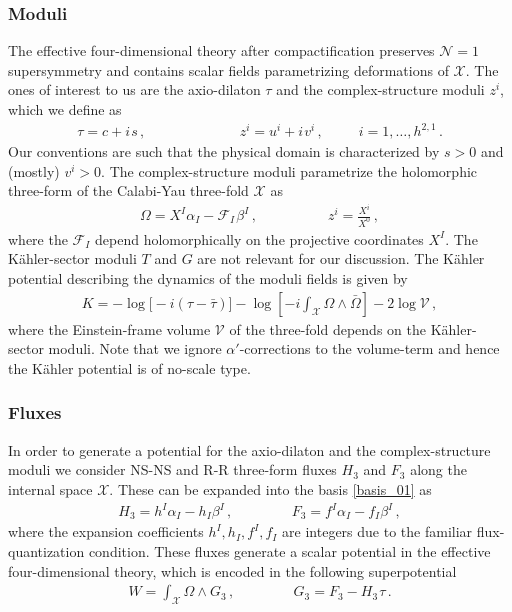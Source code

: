 \documentclass[12pt,a4paper]{article}
\newcommand{\eq}[1]{\begin{equation}
                     \begin{split} #1 \end{split}
                     \end{equation}}
\newcommand{\op}{\hspace{1pt}}
\numberwithin{equation}{section}
\begin{document}
\subsubsection*{Moduli}

The effective four-dimensional theory after compactification 
preserves $\mathcal N=1$ supersymmetry and 
contains  scalar fields parametrizing
deformations of $\mathcal X$.  The ones of interest to us are the axio-dilaton 
$\tau$ and the complex-structure moduli $z^i$, which we define as
\eq{
  \tau = c + i\op s\,, \hspace{80pt} z^i = u^i + i \op v^i \,, \hspace{30pt} i = 1,\ldots, h^{2,1} \,.
}
Our conventions are such that the physical domain is characterized by $s>0$ and (mostly) $v^i>0$. 
The complex-structure moduli parametrize the holomorphic three-form of the Calabi-Yau three-fold 
$\mathcal X$ as
\eq{
  \label{htf_001}
  \Omega = X^I \alpha_I - \mathcal F_I \op\beta^I \,, \hspace{60pt} z^i = \frac{X^i}{X^0} \,,
}
where the $\mathcal F_I$ depend holomorphically on the projective coordinates $X^I$. 
The K\"ahler-sector moduli $T$ and $G$  are not relevant for our discussion. 
The K\"ahler potential describing the dynamics of the moduli fields is given by 
\eq{
  \label{kpot}
  K =  - \log\bigl[ -i(\tau-\bar \tau) \bigr] - \log \left[ -i\int_{\mathcal X} \Omega \wedge \bar \Omega \right]
  - 2\log \mathcal V\,,
}
where 
the Einstein-frame volume $\mathcal V$ of the three-fold depends on the K\"ahler-sector moduli. 
Note  that we ignore $\alpha'$-corrections to the volume-term and hence the
K\"ahler potential  is of no-scale type.



\subsubsection*{Fluxes}


In order to generate a potential for the axio-dilaton and the complex-structure moduli
we consider NS-NS and R-R three-form fluxes $H_3$ and $F_3$ along the internal space
$\mathcal X$. These can be expanded into the basis \eqref{basis_01} as
\eq{
\label{tad_02}
  H_3 = h^I \alpha_I - h_I \beta^I \,, \hspace{50pt}
  F_3 = f^I \alpha_I - f_I \beta^I \,, 
}
where the expansion coefficients $h^I, h_I, f^I, f_I$ are integers due to the familiar flux-quantization 
condition. 
These fluxes generate a scalar potential in the effective four-dimensional  theory,
which is encoded in the following superpotential \cite{Gukov:1999ya}
\eq{
\label{pot_03}
 W = \int_{\mathcal X} \Omega \wedge G_3 \,, \hspace{50pt} 
 G_3 = F_3 - H_3 \op \tau \,.
}
\end{document}
